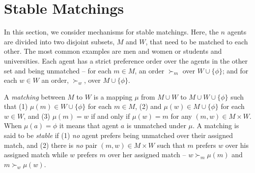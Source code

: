 
\newcommand{\men}{M}
\newcommand{\women}{W}
\newcommand{\man}{m}
\newcommand{\woman}{w}

\section{Stable Matchings}\label{sec:matching}



In this section, we consider mechanisms for stable matchings. 
Here, the $n$ agents are divided into two disjoint subsets, $\men$ and $\women$, that need to be matched to each other. The most common examples are men and women or students and universities. 
Each agent has a strict preference order over the agents in the other set and being unmatched -- for each $\man \in \men$, an order $\succ_{\man} $ over $\women\cup \{\phi\}$; and for each $\woman \in \women$ an order, $\succ_{\woman}$, over $\men\cup \{\phi\}$.  

A \emph{matching} between $\men$ to $\women$ is a mapping $\mu$ from $\men \cup \women$ to $\men \cup \women \cup \{\phi\}$ such that (1) $\mu(\man) \in \women \cup \{\phi\}$ for each $\man \in \men$, (2) and $\mu(\woman) \in \men \cup \{\phi\}$ for each $\woman \in \women$, and (3) $\mu(\man) = \woman$ if and only if $\mu(\woman) = \man$ for any $(\man, \woman) \in \men \times \women$. 
When $\mu(a) = \phi$ it means that agent $a$ is unmatched under $\mu$. 
%
A matching is said to be \emph{stable} if (1) \emph{no} agent prefers being unmatched over their assigned match, and (2) there is \emph{no} pair $(\man, \woman) \in \men \times \women$ such that $\man$ prefers $\woman$ over his assigned match while $\woman$ prefers $\man$ over her assigned match -- $\woman \succ_{\man} \mu(\man)$ and $\man \succ_{\woman} \mu(\woman)$.



